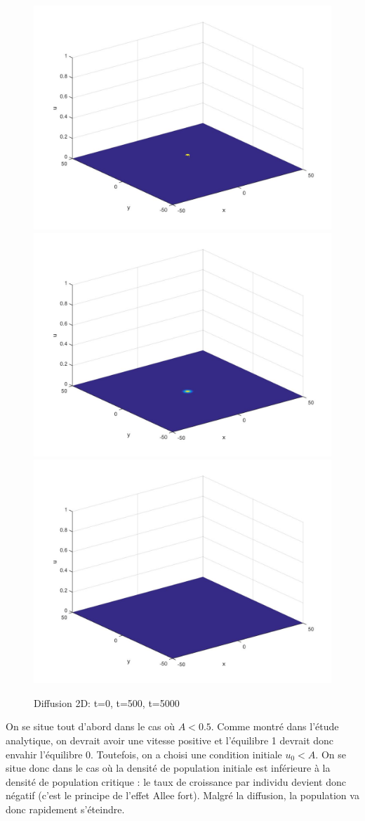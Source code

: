\documentclass[a4paper,11pt]{article}
\begin{document}
\begin{figure}[H]
	\centering
	\includegraphics[width=0.3\linewidth]{Allee/311__1_}\hfill
    \includegraphics[width=0.3\linewidth]{Allee/311__2_}\hfill
	\includegraphics[width=0.3\linewidth]{Allee/311__3_}
    \caption{Diffusion 2D: t=0, t=500, t=5000}
\end{figure}
On se situe tout d'abord dans le cas où $A<0.5$. Comme montré dans l'étude analytique, on devrait avoir une vitesse positive et l'équilibre 1 devrait donc envahir l'équilibre 0. Toutefois, on a choisi une condition initiale $u_0<A$. On se situe donc dans le cas où la densité de population initiale est inférieure à la densité de population critique : le taux de croissance par individu devient donc négatif (c'est le principe de l'effet Allee fort). Malgré la diffusion, la population va donc rapidement s'éteindre.
\end{document}
